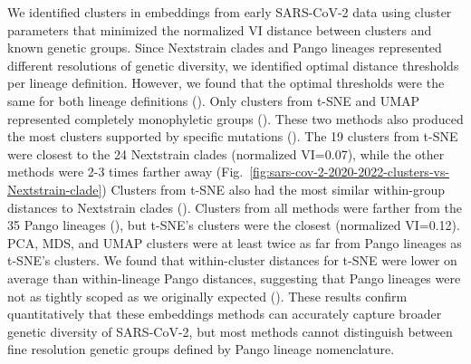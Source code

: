 \documentclass[10pt,letterpaper]{article}
\begin{document}
We identified clusters in embeddings from early SARS-CoV-2 data using cluster parameters that minimized the normalized VI distance between clusters and known genetic groups.
Since Nextstrain clades and Pango lineages represented different resolutions of genetic diversity, we identified optimal distance thresholds per lineage definition.
However, we found that the optimal thresholds were the same for both lineage definitions ().
Only clusters from t-SNE and UMAP represented completely monophyletic groups ().
These two methods also produced the most clusters supported by specific mutations ().
The 19 clusters from t-SNE were closest to the 24 Nextstrain clades (normalized VI=0.07), while the other methods were 2-3 times farther away (Fig.~\ref{fig:sars-cov-2-2020-2022-clusters-vs-Nextstrain-clade})
Clusters from t-SNE also had the most similar within-group distances to Nextstrain clades ().
Clusters from all methods were farther from the 35 Pango lineages (), but t-SNE's clusters were the closest (normalized VI=0.12).
PCA, MDS, and UMAP clusters were at least twice as far from Pango lineages as t-SNE's clusters.
We found that within-cluster distances for t-SNE were lower on average than within-lineage Pango distances, suggesting that Pango lineages were not as tightly scoped as we originally expected ().
These results confirm quantitatively that these embeddings methods can accurately capture broader genetic diversity of SARS-CoV-2, but most methods cannot distinguish between fine resolution genetic groups defined by Pango lineage nomenclature.
\end{document}
